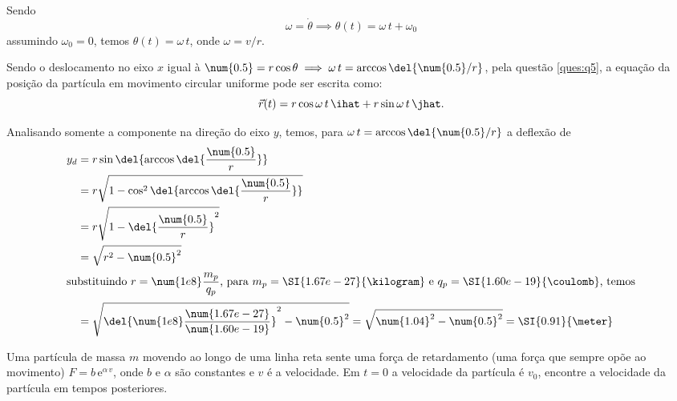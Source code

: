 \documentclass[]{IMTexam}
\begin{document}
\begin{questions}
\begin{solution}
		Sendo \[ \omega=\dot{\theta}\implies \theta(t)=\omega\,t+\omega_0 \]
		assumindo $ \omega_0=0 $, temos $ \theta(t)=\omega\,t $, onde $ \omega=v/r $.

		Sendo o deslocamento no eixo $ x $ igual à $ \num{0.5}=r\cos\theta\implies\omega\,t=\arccos\del{\num{0.5}/r} $, pela questão \ref{ques:q5}, a equação da posição da partícula em movimento circular uniforme pode ser escrita como:
		\[ \vec{r}(t)=r\cos\omega\,t\,\ihat+r\sin\omega\,t\,\jhat. \]

		Analisando somente a componente na direção do eixo $ y $, temos, para $ \omega\,t=\arccos\del{\num{0.5}/r} $ a deflexão de
		\begin{align*}
			y_d & =r\sin\del{\arccos\del{\dfrac{\num{0.5}}{r}}}                                                                                         \\
			    & =r\sqrt{1-\cos^{2}\del{\arccos\del{\dfrac{\num{0.5}}{r}}}}                                                                            \\
			    & =r\sqrt{1-\del{\dfrac{\num{0.5}}{r}}^{2}}                                                                                             \\
			    & =\sqrt{r^{2}-\num{0.5}^{2}}                                                                                                           \\
			\intertext{substituindo $ r=\num{1e8}\dfrac{m_p}{q_p} $, para $ m_p=\SI{1.67e-27}{\kilogram} $ e $ q_p=\SI{1.60e-19}{\coulomb} $, temos}
			    & =\sqrt{\del{\num{1e8}\dfrac{\num{1.67e-27}}{\num{1.60e-19}}}^{2}-\num{0.5}^{2}}=\sqrt{\num{1.04}^{2}-\num{0.5}^{2}}=\SI{0.91}{\meter}
		\end{align*}


	\end{solution}

	\clearpage

	\question
	Uma partícula de massa $ m $ movendo ao longo de uma linha reta sente uma força de retardamento (uma força que sempre opõe ao movimento) $ F=b\,\mathrm{e}^{\alpha\,v} $, onde $ b $ e $\alpha$ são constantes e $ v $ é a velocidade. Em $ t = 0 $ a velocidade da partícula é $ v_0 $, encontre a velocidade da partícula em tempos posteriores.


\end{questions}
\end{document}

